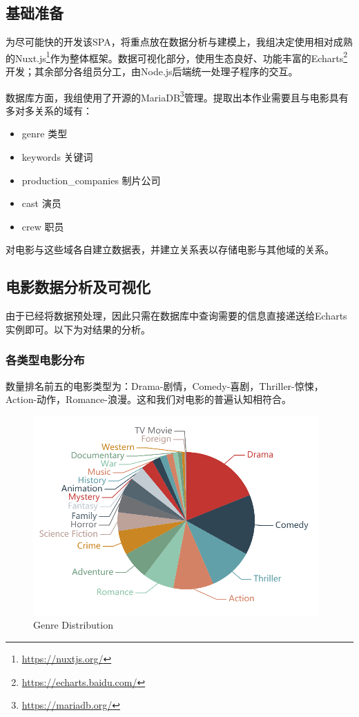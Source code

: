 \documentclass[UTF8]{ctexart}
\begin{document}
\subsection{基础准备}
\par 为尽可能快的开发该SPA，将重点放在数据分析与建模上，我组决定使用相对成熟的Nuxt.js\footnote{\href{https://nuxtjs.org/}{https://nuxtjs.org/}}作为整体框架。数据可视化部分，使用生态良好、功能丰富的Echarts\footnote{\href{https://echarts.baidu.com/}{https://echarts.baidu.com/}}开发；其余部分各组员分工，由Node.js后端统一处理子程序的交互。
\par 数据库方面，我组使用了开源的MariaDB\footnote{\href{https://mariadb.org/}{https://mariadb.org/}}管理。提取出本作业需要且与电影具有多对多关系的域有：
\begin{itemize}
  \item{genre} 类型
  \item{keywords} 关键词
  \item{production\_companies} 制片公司
  \item{cast} 演员
  \item{crew} 职员
\end{itemize}
\par 对电影与这些域各自建立数据表，并建立关系表以存储电影与其他域的关系。

\subsection{电影数据分析及可视化}
\par 由于已经将数据预处理，因此只需在数据库中查询需要的信息直接递送给Echarts实例即可。以下为对结果的分析。
\subsubsection{各类型电影分布}
\par 数量排名前五的电影类型为：Drama-剧情，Comedy-喜剧，Thriller-惊悚，Action-动作，Romance-浪漫。这和我们对电影的普遍认知相符合。
\begin{figure}[ht]
  \centering
  \includegraphics[scale=.5]{distribution.png}
  \caption{Genre Distribution}
\end{figure}
\end{document}
